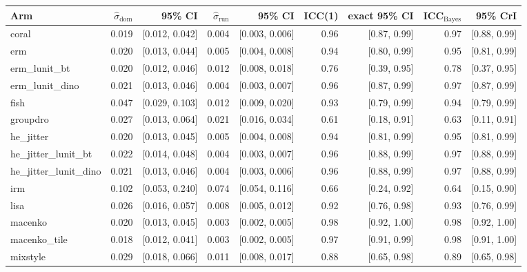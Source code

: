 \begin{tabular}{lrrrrrrrr}
\toprule
Arm & $\hat\sigma_\text{dom}$ & 95\% CI & $\hat\sigma_\text{run}$ & 95\% CI & ICC(1) & exact 95\% CI & ICC$_\text{Bayes}$ & 95\% CrI \\
\midrule
coral & 0.019 & [0.012, 0.042] & 0.004 & [0.003, 0.006] & 0.96 & [0.87, 0.99] & 0.97 & [0.88, 0.99] \\
erm & 0.020 & [0.013, 0.044] & 0.005 & [0.004, 0.008] & 0.94 & [0.80, 0.99] & 0.95 & [0.81, 0.99] \\
erm\_lunit\_bt & 0.020 & [0.012, 0.046] & 0.012 & [0.008, 0.018] & 0.76 & [0.39, 0.95] & 0.78 & [0.37, 0.95] \\
erm\_lunit\_dino & 0.021 & [0.013, 0.046] & 0.004 & [0.003, 0.007] & 0.96 & [0.87, 0.99] & 0.97 & [0.87, 0.99] \\
fish & 0.047 & [0.029, 0.103] & 0.012 & [0.009, 0.020] & 0.93 & [0.79, 0.99] & 0.94 & [0.79, 0.99] \\
groupdro & 0.027 & [0.013, 0.064] & 0.021 & [0.016, 0.034] & 0.61 & [0.18, 0.91] & 0.63 & [0.11, 0.91] \\
he\_jitter & 0.020 & [0.013, 0.045] & 0.005 & [0.004, 0.008] & 0.94 & [0.81, 0.99] & 0.95 & [0.81, 0.99] \\
he\_jitter\_lunit\_bt & 0.022 & [0.014, 0.048] & 0.004 & [0.003, 0.007] & 0.96 & [0.88, 0.99] & 0.97 & [0.88, 0.99] \\
he\_jitter\_lunit\_dino & 0.021 & [0.013, 0.046] & 0.004 & [0.003, 0.006] & 0.96 & [0.88, 0.99] & 0.97 & [0.88, 0.99] \\
irm & 0.102 & [0.053, 0.240] & 0.074 & [0.054, 0.116] & 0.66 & [0.24, 0.92] & 0.64 & [0.15, 0.90] \\
lisa & 0.026 & [0.016, 0.057] & 0.008 & [0.005, 0.012] & 0.92 & [0.76, 0.98] & 0.93 & [0.76, 0.99] \\
macenko & 0.020 & [0.013, 0.045] & 0.003 & [0.002, 0.005] & 0.98 & [0.92, 1.00] & 0.98 & [0.92, 1.00] \\
macenko\_tile & 0.018 & [0.012, 0.041] & 0.003 & [0.002, 0.005] & 0.97 & [0.91, 0.99] & 0.98 & [0.91, 1.00] \\
mixstyle & 0.029 & [0.018, 0.066] & 0.011 & [0.008, 0.017] & 0.88 & [0.65, 0.98] & 0.89 & [0.65, 0.98] \\

\end{tabular}
